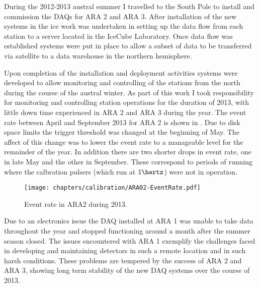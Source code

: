 During the 2012-2013 austral summer I travelled to the South Pole to install and commission the DAQs for ARA 2 and ARA 3. After installation of the new systems in the ice work was undertaken in setting up the data flow from each station to a server located in the IceCube Laboratory. Once data flow was established systems were put in place to allow a subset of data to be transferred via satellite to a data warehouse in the northern hemisphere. 

Upon completion of the installation and deployment activities systems were developed to allow monitoring and controlling of the stations from the north during the course of the austral winter. As part of this work I took responsibility for monitoring and controlling station operations for the duration of 2013, with little down time experienced in ARA 2 and ARA 3 during the year. The event rate between April and September 2013 for ARA 2 is shown in . Due to disk space limits the trigger threshold was changed at the beginning of May. The affect of this change was to lower the event rate to a manageable level for the remainder of the year. In addition there are two shorter drops in event rate, one in late May and the other in September. These correspond to periods of running where the calbration pulsers (which run at $1 \hertz$) were not in operation.

\begin{figure}
  \texttt{[image: chapters/calibration/ARA02-EventRate.pdf]}
  \caption{Event rate in ARA2 during 2013.}
  \label{fig:calibration:ARA1-3-development:ARA2-Rate}
\end{figure}

Due to an electronics issue the DAQ installed at ARA 1 was unable to take data throughout the year and stopped functioning around a month after the summer season closed. The issues encountered with ARA 1 exemplify the challenges faced in developing and maintaining detectors in such a remote location and in such harsh conditions. These problems are tempered by the success of ARA 2 and ARA 3, showing long term stability of the new DAQ systems over the course of 2013.






